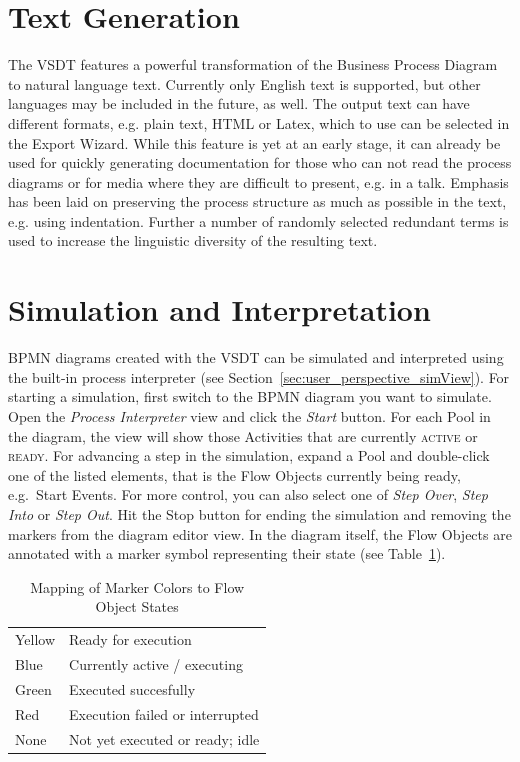 
\section{Text Generation}
\label{sec:user_features_text}
 
The VSDT features a powerful transformation of the Business Process Diagram to
natural language text.  Currently only English text is supported, but other
languages may be included in the future, as well.  The output text can have
different formats, e.g. plain text, HTML or Latex, which to use can be selected
in the Export Wizard.  While this feature is yet at an early stage, it can already
be used for quickly generating documentation for those who can not read the
process diagrams or for media where they are difficult to present, e.g. in a talk.
Emphasis has been laid on preserving the process structure as much as possible in
the text, e.g. using indentation.  Further a number of randomly selected redundant
terms is used to increase the linguistic diversity of the resulting text.



\section{Simulation and Interpretation}
\label{sec:user_features_sim}

BPMN diagrams created with the VSDT can be simulated and interpreted using the
built-in process interpreter (see Section~\ref{sec:user_perspective_simView}).
For starting a simulation, first switch to the BPMN diagram you want to simulate.
Open the \emph{Process Interpreter} view and click the \emph{Start} button.  For
each Pool in the diagram, the view will show those Activities that are currently
\textsc{active} or \textsc{ready}.  For advancing a step in the simulation, expand
a Pool and double-click one of the listed elements, that is the Flow Objects
currently being ready, e.g.\ Start Events.  For more control, you can also select
one of \emph{Step Over}, \emph{Step Into} or \emph{Step Out}.  Hit the Stop button
for ending the simulation and removing the markers from the diagram editor view.
In the diagram itself, the Flow Objects are annotated with a marker symbol
representing their state (see Table~\ref{tab:markerColors}).
\begin{table}[ht]
	\centering
	\caption{Mapping of Marker Colors to Flow Object States}
	\label{tab:markerColors}
	\begin{tabular}{|l|l|}
		\hline
		Yellow & Ready for execution             \\
		Blue   & Currently active / executing    \\
		Green  & Executed succesfully            \\
		Red    & Execution failed or interrupted \\
		None   & Not yet executed or ready; idle \\
		\hline
	\end{tabular}
\end{table}

